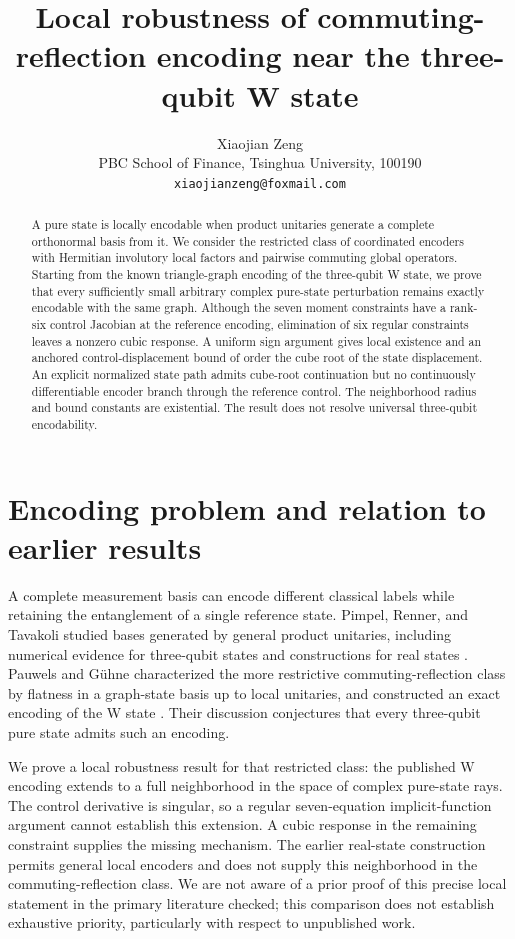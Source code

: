 \documentclass[11pt]{article}
\title{Local robustness of commuting-reflection encoding near the three-qubit W state}
\author{Xiaojian Zeng\\\small PBC School of Finance, Tsinghua University, 100190\\
\small\texttt{xiaojianzeng@foxmail.com}}
\date{}
\begin{document}
\maketitle
\begin{abstract}
A pure state is locally encodable when product unitaries generate a complete orthonormal basis from it. We consider the restricted class of coordinated encoders with Hermitian involutory local factors and pairwise commuting global operators. Starting from the known triangle-graph encoding of the three-qubit W state, we prove that every sufficiently small arbitrary complex pure-state perturbation remains exactly encodable with the same graph. Although the seven moment constraints have a rank-six control Jacobian at the reference encoding, elimination of six regular constraints leaves a nonzero cubic response. A uniform sign argument gives local existence and an anchored control-displacement bound of order the cube root of the state displacement. An explicit normalized state path admits cube-root continuation but no continuously differentiable encoder branch through the reference control. The neighborhood radius and bound constants are existential. The result does not resolve universal three-qubit encodability.
\end{abstract}

\section{Encoding problem and relation to earlier results}
A complete measurement basis can encode different classical labels while retaining the entanglement of a single reference state. Pimpel, Renner, and Tavakoli studied bases generated by general product unitaries, including numerical evidence for three-qubit states and constructions for real states \cite{Pimpel2023}. Pauwels and G\"uhne characterized the more restrictive commuting-reflection class by flatness in a graph-state basis up to local unitaries, and constructed an exact encoding of the W state \cite[Theorem 6 and Proposition 7]{Pauwels2026}. Their discussion conjectures that every three-qubit pure state admits such an encoding.

We prove a local robustness result for that restricted class: the published W encoding extends to a full neighborhood in the space of complex pure-state rays. The control derivative is singular, so a regular seven-equation implicit-function argument cannot establish this extension. A cubic response in the remaining constraint supplies the missing mechanism. The earlier real-state construction permits general local encoders and does not supply this neighborhood in the commuting-reflection class. We are not aware of a prior proof of this precise local statement in the primary literature checked; this comparison does not establish exhaustive priority, particularly with respect to unpublished work.
\end{document}
